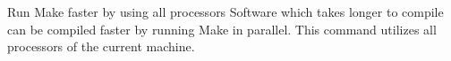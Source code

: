 \begin{block}{Run Make faster by using all processors}
  Software which takes longer to compile can be compiled faster by running Make in parallel. This command utilizes all processors of the current machine.
\end{block}
